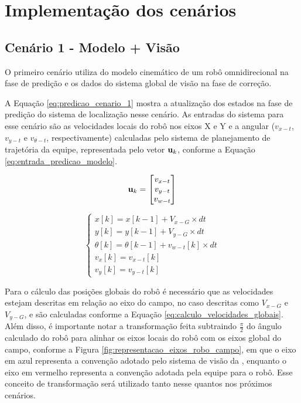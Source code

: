 \documentclass[acronym, symbols, table]{fei}
\begin{document}
		\section{Implementação dos cenários}
		
			\subsection{Cenário 1 - Modelo + Visão} \label{sec:implementacao_cenario_1}
			
				O primeiro cenário utiliza do modelo cinemático de um robô omnidirecional na fase de predição e os dados do sistema global de visão na fase de correção.
				
				A Equação \ref{eq:predicao_cenario_1} mostra a atualização dos estados na fase de predição do sistema de localização nesse cenário. As entradas do sistema para esse cenário são as velocidades locais do robô nos eixos X e Y e a angular ($v_{x-t}$, $v_{y-t}$ e $v_{\theta-t}$, respectivamente) calculadas pelo sistema de planejamento de trajetória da equipe, representada pelo vetor $\text{\textbf{u}}_k$, conforme a Equação \ref{eq:entrada_predicao_modelo}.
				
				\begin{equation}\label{eq:entrada_predicao_modelo}
					\text{\textbf{u}}_k =
					\begin{bmatrix}
						v_{x-t} \\
						v_{y-t} \\
						v_{w-t}
					\end{bmatrix}
				\end{equation}
				
				\begin{equation}\label{eq:predicao_cenario_1}
					\begin{cases}
						x[k] = x[k-1] + V_{x-G} \times dt \\
						y[k] = y[k-1] + V_{y-G} \times dt  \\
						\theta[k] = \theta[k-1] + v_{w-t}[k] \times dt \\
						v_x[k] = v_{x-t}[k]\\
						v_y[k] = v_{y-t}[k]
					\end{cases}
				\end{equation}
			
			Para o cálculo das posições globais do robô é necessário que as velocidades estejam descritas em relação ao eixo do campo, no caso descritas como $V_{x-G}$ e $V_{y-G}$, e são calculadas conforme a Equação \ref{eq:calculo_velocidades_globais}. Além disso, é importante notar a transformação feita subtraindo $\frac{\pi}{2}$ do ângulo calculado do robô para alinhar os eixos locais do robô com os eixos global do campo, conforme a Figura \ref{fig:representacao_eixos_robo_campo}, em que o eixo em azul representa a convenção adotado pelo sistema de visão da , enquanto o eixo em vermelho representa a convenção adotada pela equipe para o robô. Esse conceito de transformação será utilizado tanto nesse quantos nos próximos cenários.
			
\end{document}

